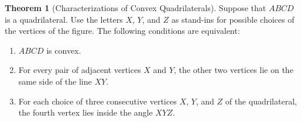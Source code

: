 \documentclass{tufte-handout}
\theoremstyle{definition}
\newtheorem{theorem}{Theorem}[section]
\begin{document}
\begin{theorem}[Characterizations of Convex Quadrilaterals]
Suppose that $ABCD$ is a quadrilateral. Use the letters $X$, $Y$, and $Z$ as stand-ins for possible choices of the vertices of the figure. The following conditions are equivalent:
\begin{enumerate}
\item $ABCD$ is convex.
\item For every pair of adjacent vertices $X$ and $Y$, the other two vertices lie on the same side of the line $XY$.
\item For each choice of three consecutive vertices $X$, $Y$, and $Z$ of the quadrilateral, the fourth vertex lies inside the angle $XYZ$.
\end{enumerate}

\end{theorem}
\end{document}
